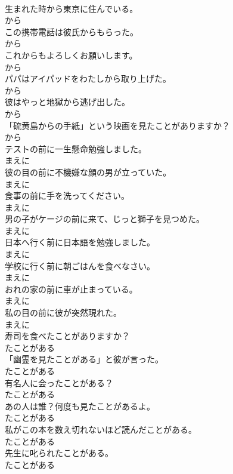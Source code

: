 \documentclass[8pt]{extreport}
\begin{document}
\begin{CJK}{UTF8}{min}
\\	生まれた時から東京に住んでいる。	
\\	から	
\\	この携帯電話は彼氏からもらった。	
\\	から	
\\	これからもよろしくお願いします。	
\\	から	
\\	パパはアイパッドをわたしから取り上げた。	
\\	から	
\\	彼はやっと地獄から逃げ出した。	
\\	から	
\\	「硫黄島からの手紙」という映画を見たことがありますか？	
\\	から	
\\	テストの前に一生懸命勉強しました。	
\\	まえに	
\\	彼の目の前に不機嫌な顔の男が立っていた。	
\\	まえに	
\\	食事の前に手を洗ってください。	
\\	まえに	
\\	男の子がケージの前に来て、じっと獅子を見つめた。	
\\	まえに	
\\	日本へ行く前に日本語を勉強しました。	
\\	まえに	
\\	学校に行く前に朝ごはんを食べなさい。	
\\	まえに	
\\	おれの家の前に車が止まっている。	
\\	まえに	
\\	私の目の前に彼が突然現れた。	
\\	まえに	
\\	寿司を食べたことがありますか？	
\\	たことがある	
\\	「幽霊を見たことがある」と彼が言った。	
\\	たことがある	
\\	有名人に会ったことがある？	
\\	たことがある	
\\	あの人は誰？何度も見たことがあるよ。	
\\	たことがある	
\\	私がこの本を数え切れないほど読んだことがある。	
\\	たことがある	
\\	先生に叱られたことがある。	
\\	たことがある	

\end{CJK}
\end{document}
